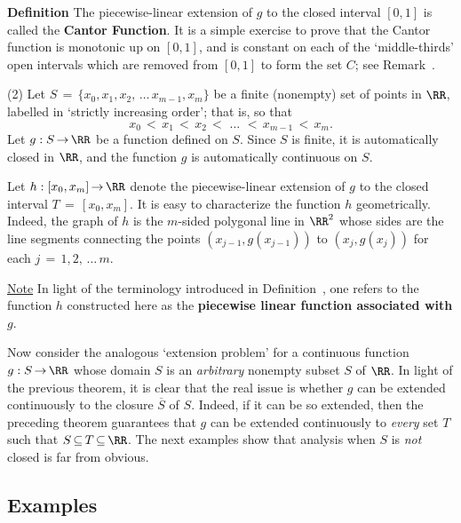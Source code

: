         {\bf Definition} The piecewise-linear extension of $g$ to the closed interval $[0,1]$ is called the {\bf Cantor Function}.
    It is a simple exercise to prove that the Cantor function is monotonic up on $[0,1]$,
    and is constant on each of the `middle-thirds' open intervals which are removed from $[0,1]$ to form the set $C$; see Remark~.

\V

        (2) Let $S \,=\, \{x_{0},x_{1},x_{2},\,{\ldots}\,x_{m-1},x_{m}\}$ be a finite (nonempty) set of points in ${\RR}$, labelled in `strictly increasing order';
    that is, so that
        \begin{displaymath}
        x_{0}\,<\,x_{1}\,<\,x_{2}\,<\,\,{\ldots}\,\,<\,x_{m-1}\,<\,x_{m}.
        \end{displaymath}
    Let $g:S \,{\rightarrow}\, {\RR}$ be a function defined on $S$.
    Since $S$ is finite, it is automatically closed in ${\RR}$, and the function $g$ is automatically continuous on $S$.

        Let $h:[x_{0},x_{m}] \,{\rightarrow}\, {\RR}$ denote the piecewise-linear extension of $g$ to the closed interval $T \,=\, [x_{0},x_{m}]$.
    It is easy to characterize the function $h$ geometrically.
    Indeed, the graph of $h$ is the $m$-sided polygonal line in ${\RR}^{2}$ whose sides are the line segments connecting the points $(x_{j-1},g(x_{j-1}))$ to $(x_{j},g(x_{j}))$ for each $j \,=\, 1,2,\,{\ldots}\,m$.

        \underline{Note} In light of the terminology introduced in Definition~, one refers to the function $h$ constructed here as the {\bf piecewise linear function associated with $g$}.


\V
\V

        Now consider the analogous `extension problem' for a continuous function $g:S \,{\rightarrow}\, {\RR}$ whose domain $S$ is an {\em arbitrary} nonempty subset $S$ of ${\RR}$.
    In light of the previous theorem, it is clear that the real issue is whether $g$ can be extended continuously to the closure $\overline{S}$ of $S$.
    Indeed, if it can be so extended, then the preceding theorem guarantees that $g$  can be extended continuously to {\em every} set $T$ such that $S \,{\subseteq}\, T \,{\subseteq}\, {\RR}$.
    The next examples show that analysis when $S$ is {\em not} closed is far from obvious.

\V

            \subsection{\small{\bf Examples}}
            \label{ExampF20.50}

